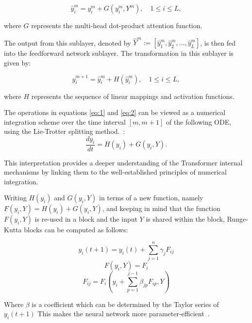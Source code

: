 \documentclass[12pt,a4paper]{report}
\begin{document}
\begin{equation}\label{eq:1}
  \hat{y}_i^m = y_i^m + G(y_i^m, Y^m), \quad 1 \leq i \leq L,
\end{equation}

where \( G \) represents the multi-head dot-product attention function.

The output from this sublayer, denoted by \( \hat{Y}^m := [\hat{y}_1^m, \hat{y}_2^m, \ldots, \hat{y}_L^m] \), is then fed into the feedforward network sublayer. The transformation in this sublayer is given by:

\begin{equation}\label{eq:2}
  y_i^{m+1} = \hat{y}_i^m + H(\hat{y}_i^m), \quad 1 \leq i \leq L,
\end{equation}

where \( H \) represents the sequence of linear mappings and activation functions.

The operations in equations \ref{eq:1} and \ref{eq:2} can be viewed as a numerical integration scheme over the time interval \([m, m+1]\) of the following ODE, using the Lie-Trotter splitting method.~\cite{lu2019understanding, dutta2021redesigning}:
\begin{equation}
  \frac{dy_i}{dt} = H(y_i) + G(y_i, Y).
\end{equation}

This interpretation provides a deeper understanding of the Transformer internal mechanisms by linking them to the well-established principles of numerical integration.

Writing $H(y_i)$ and $G(y_i, Y)$ in terms of a new function, namely $F(y_i, Y) = H(y_i) + G(y_i, Y)$, and keeping in mind that the function $F(y_i, Y)$ is re-used in a block and the input $Y$ is shared within the block, Runge-Kutta blocks can be computed as follows:

\begin{equation}
  y_i(t + 1) = y_i(t) + \sum_{j=1}^{n}\gamma_{j}F_{ij}
\end{equation}
\begin{equation}
  F(y_i, Y) = F_i
\end{equation}
\begin{equation}
  F_{ij} = F_i(y_i + \sum_{p=1}^{j-1}\beta_{jp}F_{ip}, Y)
\end{equation}

Where $\beta$ is a coefficient which can be determined by the Taylor series of $y_i(t+1)$ This makes the neural network more parameter-efficient~\cite{li2022ode}.
\end{document}
